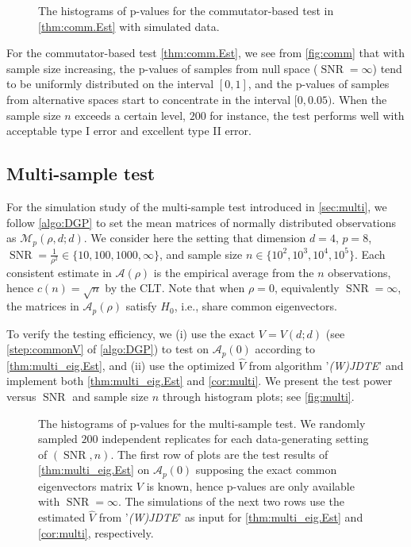 \documentclass[12pt]{article}
\numberwithin{thm}{section}
\numberwithin{defn}{section}
\numberwithin{lem}{section}
\numberwithin{prop}{section}
\numberwithin{cor}{section}
\numberwithin{rem}{section}
\DeclareMathOperator{\SNR}{SNR}
\begin{document}
\begin{figure}[h] %
    \centering
    \centerline{}
    \caption{The histograms of p-values for the commutator-based test in \autoref{thm:comm.Est} with simulated data.}
   \label{fig:comm}
\end{figure}

For the commutator-based test \autoref{thm:comm.Est}, we see from \autoref{fig:comm} that with sample size increasing, the p-values of samples from null space ($\SNR = \infty$) tend to be uniformly distributed on the interval $[0,1]$, and the p-values of samples from alternative spaces start to concentrate in the interval $[0, 0.05)$. When the sample size $n$ exceeds a certain level, $200$ for instance, the test performs well with acceptable type I error and excellent type II error.


\vspace{-0.5cm}
\subsection{Multi-sample test} \label{se:sim-multi}
\vspace{-0.3cm}
For the simulation study of the multi-sample test introduced in \autoref{sec:multi}, we follow \autoref{algo:DGP} to set the mean matrices of normally distributed observations as $\mathcal{M}_p(\rho, d; d)$. We consider here the setting that dimension $d = 4$, $p = 8$, $\SNR = \frac{1}{\rho^2} \in \{10, 100, 1000, \infty\}$, and sample size $n \in \{10^2, 10^3, 10^4, 10^5\}$. Each consistent estimate in $\mathcal{A}(\rho)$ is the empirical average from the $n$ observations, hence $c(n) = \sqrt{n}$ by the CLT. Note that when $\rho = 0$, equivalently $\SNR = \infty$, the matrices in $\mathcal{A}_p(\rho)$ satisfy $H_0$, i.e., share common eigenvectors.

To verify the testing efficiency, we (i) use the exact $V = V(d; d)$ (see \cref{step:commonV} of \autoref{algo:DGP}) to test on $\mathcal{A}_p(0)$ according to \autoref{thm:multi_eig.Est}, and (ii) use the optimized $\widehat{V}$ from algorithm '\textit{(W)JDTE}' and implement both \autoref{thm:multi_eig.Est} and \autoref{cor:multi}. We present the test power versus $\SNR$ and sample size $n$ through histogram plots; see \autoref{fig:multi}.

\begin{figure}[htbp] %
    \centering
    \centerline{}
    \caption{The histograms of p-values for the multi-sample test. We randomly sampled $200$ independent replicates for each data-generating setting of $(\SNR, n)$. The first row of plots are the test results of \autoref{thm:multi_eig.Est} on $\mathcal{A}_p(0)$ supposing the exact common eigenvectors matrix $V$ is known, hence p-values are only available with $\SNR = \infty$. The simulations of the next two rows use the estimated $\widehat{V}$ from '\textit{(W)JDTE}' as input for \autoref{thm:multi_eig.Est} and \autoref{cor:multi}, respectively.}
   \label{fig:multi}
\end{figure}
\end{document}
